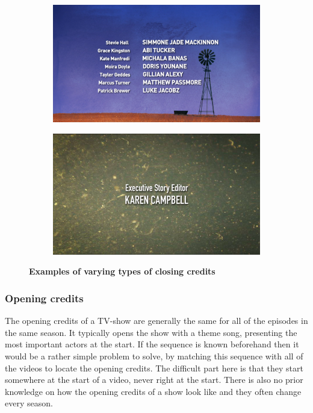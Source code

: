 \documentclass{article}
\begin{document}
\begin{figure}[H]
\begin{subfigure}[b]{0.4\textwidth}
  \end{subfigure}
\begin{subfigure}[b]{0.4\textwidth}
	\includegraphics[width=\textwidth]{images/diffcredits.png}
\end{subfigure}
\begin{subfigure}[b]{0.4\textwidth}
	\includegraphics[width=\textwidth]{images/diffcredits2.png}
\end{subfigure}
  \caption{\textbf{Examples of varying types of closing credits}}
  \label{closingcredits}
\end{figure}

\subsubsection{Opening credits}
The opening credits of a TV-show are generally the same for all of the episodes in the same season. It typically opens the show with a theme song, presenting the most important actors at the start. If the sequence is known beforehand then it would be a rather simple problem to solve, by matching this sequence with all of the videos to locate the opening credits. The difficult part here is that they start somewhere at the start of a video, never right at the start. There is also no prior knowledge on how the opening credits of a show look like and they often change every season.
\end{document}
